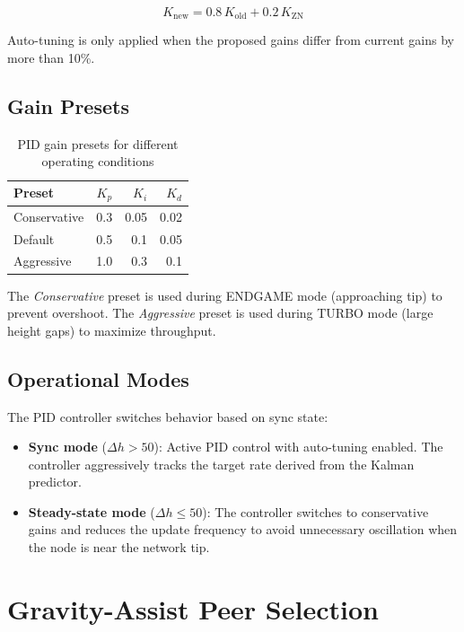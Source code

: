 \documentclass[11pt,a4paper]{article}
\begin{document}
\begin{equation}
K_{\text{new}} = 0.8 \, K_{\text{old}} + 0.2 \, K_{\text{ZN}}
\label{eq:gain_smoothing}
\end{equation}

Auto-tuning is only applied when the proposed gains differ from current gains by more than 10\%.

\subsection{Gain Presets}

\begin{table}[h]
\centering
\begin{tabular}{lrrr}
\toprule
\textbf{Preset} & \textbf{$K_p$} & \textbf{$K_i$} & \textbf{$K_d$} \\
\midrule
Conservative & 0.3 & 0.05 & 0.02 \\
Default & 0.5 & 0.1 & 0.05 \\
Aggressive & 1.0 & 0.3 & 0.1 \\
\bottomrule
\end{tabular}
\caption{PID gain presets for different operating conditions}
\label{tab:pid_gains}
\end{table}

The \emph{Conservative} preset is used during ENDGAME mode (approaching tip) to prevent overshoot. The \emph{Aggressive} preset is used during TURBO mode (large height gaps) to maximize throughput.

\subsection{Operational Modes}

The PID controller switches behavior based on sync state:

\begin{itemize}
    \item \textbf{Sync mode} ($\Delta h > 50$): Active PID control with auto-tuning enabled. The controller aggressively tracks the target rate derived from the Kalman predictor.
    \item \textbf{Steady-state mode} ($\Delta h \leq 50$): The controller switches to conservative gains and reduces the update frequency to avoid unnecessary oscillation when the node is near the network tip.
\end{itemize}

\section{Gravity-Assist Peer Selection}
\label{sec:gravity}
\end{document}
